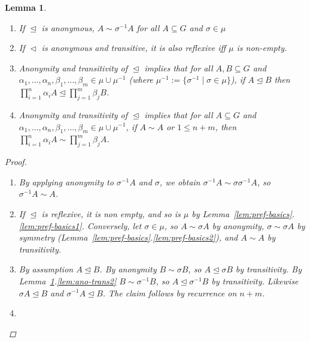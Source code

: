 \documentclass[11pt]{article}
\newtheorem{lemma}[definition]{Lemma}
\newcommand{\releq}{\mathrel{\trianglelefteq}}
\newcommand{\rel}{\mathrel{\triangleleft}}
\begin{document}
\begin{lemma}\label{lem:ano-trans}
\begin{enumerate}
 \item\label{lem:ano-trans1} If $\releq$ is anonymous, $A \sim \sigma^{-1}A$ for all $A \subseteq G$ and $\sigma \in \mu$

 \item\label{lem:ano-trans2} If $\rel$ is anonymous and transitive, it is also reflexive iff $\mu$ is non-empty.  
 
  \item\label{lem:ano-trans3} Anonymity and transitivity of $\releq$ implies that for all $A, B \subseteq G$ and $\alpha_1,\dots,\alpha_n,\beta_1,\dots, \beta_m \in \mu \cup \mu^{-1}$ (where $\mu^{-1} := \{\sigma^{-1} \mid \sigma \in \mu\}$), if $A \releq B$ then $\prod_{i =1}^n \alpha_i A \releq \prod_{j =1}^m \beta_j B$.
 
 \item\label{lem:ano-trans4} Anonymity and transitivity of $\releq$ implies that for all $A \subseteq G$ and $\alpha_1,\dots,\alpha_n,\beta_1,\dots, \beta_m \in \mu \cup \mu^{-1}$, if $A \sim A$ or $1 \leq n+m$, then $\prod_{i =1}^n \alpha_i A \sim \prod_{j =1}^m \beta_j A$.
 

\end{enumerate}
 \begin{proof}
\begin{enumerate}
 \item By applying anonymity to $\sigma^{-1}A$ and $\sigma$, we obtain $\sigma^{-1}A \sim \sigma \sigma^{-1}A$, so $\sigma^{-1}A \sim A$.
 
 \item If $\releq$ is reflexive, it is non empty, and so is $\mu$ by Lemma~\ref{lem:pref-basics}.\ref{lem:pref-basics1}. Conversely, let $\sigma \in \mu$, so $A \sim \sigma A$ by anonymity, $\sigma \sim \sigma A$ by symmetry (Lemma~\ref{lem:pref-basics}.\ref{lem:pref-basics2}), and $A \sim A$ by transitivity.
 
 \item By assumption $A \releq B$. By anonymity $B \sim \sigma B$, so $A \releq \sigma B$ by transitivity. By Lemma~\ref{lem:ano-trans}.\ref{lem:ano-trans2} $B \sim \sigma^{-1} B$, so $A \releq \sigma^{-1} B$ by transitivity. Likewise $\sigma A \releq B$ and $\sigma^{-1} A \releq B$. The claim follows by recurrence on $n+m$. 
 
 \item 
\end{enumerate}
\end{proof}
 
\end{lemma}
\end{document}
